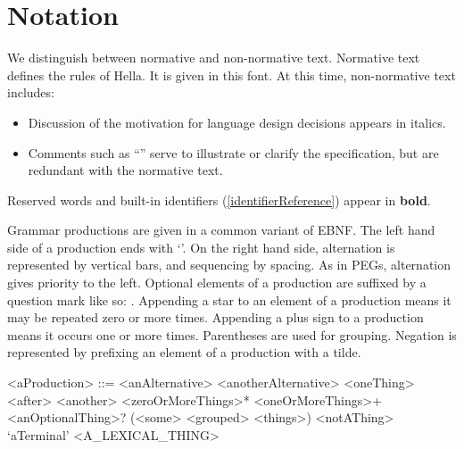 \documentclass[makeidx]{article}
\begin{document}
\section{Notation}

\LMHash{}%
We distinguish between normative and non-normative text.
Normative text defines the rules of Hella.
It is given in this font.
At this time, non-normative text includes:

\begin{itemize}
\item[Rationale]
  Discussion of the motivation for language design decisions appears in italics.
\item[Commentary]
  Comments such as
  ``''
  serve to illustrate or clarify the specification,
  but are redundant with the normative text.
\end{itemize}

\LMHash{}%
Reserved words and built-in identifiers
(\ref{identifierReference})
appear in {\bf bold}.


\LMHash{}%
Grammar productions are given in a common variant of EBNF.
The left hand side of a production ends with `\lit{::=}'.
On the right hand side, alternation is represented by vertical bars,
and sequencing by spacing.
As in PEGs, alternation gives priority to the left.
Optional elements of a production are suffixed by a question mark
like so: .
Appending a star to an element of a production means
it may be repeated zero or more times.
Appending a plus sign to a production means it occurs one or more times.
Parentheses are used for grouping.
Negation is represented by prefixing an element of a production with a tilde.


\begin{grammar}\color{commentaryColor}
<aProduction> ::= <anAlternative>
  \alt <anotherAlternative>
  \alt <oneThing> <after> <another>
  \alt <zeroOrMoreThings>*
  \alt <oneOrMoreThings>+
  \alt <anOptionalThing>?
  \alt (<some> <grouped> <things>)
  \alt \gtilde<notAThing>
  \alt `aTerminal'
  \alt <A\_LEXICAL\_THING>
\end{grammar}
\end{document}
